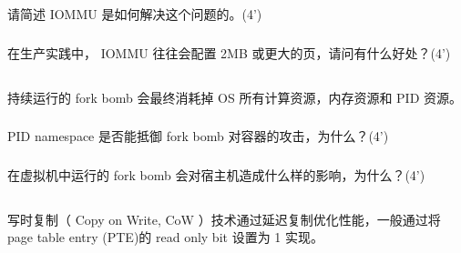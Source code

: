 \documentclass[a4paper,12pt]{article}
\newcommand{\score}[1]{(#1')}
\begin{document}
请简述 IOMMU 是如何解决这个问题的。\score{4}

\begin{answer}
  \lipsum[3]
\end{answer}

\subsubsection{}

在生产实践中， IOMMU 往往会配置 2MB 或更大的页，请问有什么好处？\score{4}

\begin{answer}
  \lipsum[3]
\end{answer}

\subsection{}

持续运行的 fork bomb 会最终消耗掉 OS 所有计算资源，内存资源和 PID 资源。

\subsubsection{}

PID namespace 是否能抵御 fork bomb 对容器的攻击，为什么？\score{4}

\begin{answer}
  \lipsum[3]
\end{answer}

\subsubsection{}

在虚拟机中运行的 fork bomb 会对宿主机造成什么样的影响，为什么？\score{4}

\begin{answer}
  \lipsum[3]
\end{answer}

\subsection{}

写时复制（ Copy on Write, CoW ）技术通过延迟复制优化性能，一般通过将 page table entry (PTE)的 read only bit 设置为 1 实现。

\subsubsection{}
\end{document}
